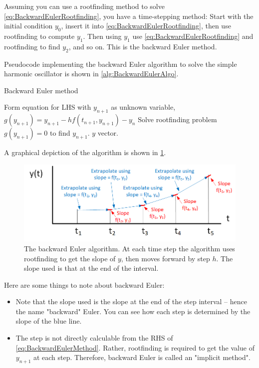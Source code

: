\documentclass[hidelinks,notitlepage]{book}
\begin{document}
Assuming you can use a rootfinding method to solve \cref{eq:BackwardEulerRootfinding}, you have a time-stepping method:  Start with the initial condition $y_0$, insert it into \cref{eq:BackwardEulerRootfinding}, then use rootfinding to compute $y_1$.  Then using $y_1$ use \cref{eq:BackwardEulerRootfinding} and rootfinding to find $y_2$, and so on.  This is the backward Euler method. 

Pseudocode implementing the backward Euler algorithm to solve the simple harmonic oscillator is shown in \cref{alg:BackwardEulerAlgo}.
\begin{algorithm}
	\caption{Backward Euler method}
	\label{alg:BackwardEulerAlgo}
	\begin{algorithmic} 
		\STATE Form equation for LHS with $y_{n+1}$ as unknown variable, $g(y_{n+1}) = y_{n+1} - h f(t_{n+1}, y_{n+1}) - y_{n}$
		\STATE Solve rootfinding problem $g(y_{n+1}) = 0$ to find $y_{n+1}$.
		\ENDFOR
		\RETURN $y$ vector.
	\end{algorithmic}
\end{algorithm}
A graphical depiction of the algorithm is shown in \cref{fig:BackwardEuler}.
\begin{figure}[tbh]
	\centering
	\includegraphics[width=0.8\columnwidth]{BackwardEuler.png}
	\caption{The backward Euler algorithm.  At each time step the algorithm uses rootfinding to get the slope of $y$, then moves forward by step $h$.  The slope used is that at the end of the interval.}
	\label{fig:BackwardEuler}
\end{figure}
Here are some things to note about backward Euler:
\begin{itemize}
	\item Note that the slope used is the slope at the end of the step interval -- hence the name "backward" Euler.  You can see how each step is determined by the slope of the blue line.
	\item The step is not directly calculable from the RHS of \cref{eq:BackwardEulerMethod}.  Rather, rootfinding is required to get the value of $y_{n+1}$ at each step.  Therefore, backward Euler is called an "implicit method".
\end{itemize}
\end{document}
